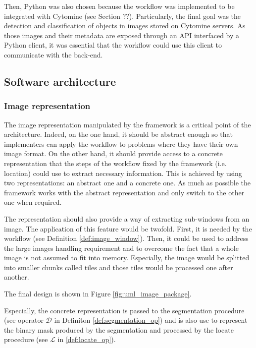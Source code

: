 Then, Python was also chosen because the workflow was implemented to be integrated with Cytomine (see Section ??). Particularly, the final goal was the detection and classification of objects in images stored on Cytomine servers. As those images and their metadata are exposed through an API interfaced by a Python client, it was essential that the workflow could use this client to communicate with the back-end. 

 
\subsection{Software architecture}

\subsubsection{Image representation} 
The image representation manipulated by the framework is a critical point of the architecture. Indeed, on the one hand, it should be abstract enough so that implementers can apply the workflow to problems where they have their own image format. On the other hand, it should provide access to a concrete representation that the steps of the workflow fixed by the framework (i.e. location) could use to extract necessary information. This is achieved by using two representations: an abstract one and a concrete one. As much as possible the framework works with the abstract representation and only switch to the other one when required. 

The representation should also provide a way of extracting sub-windows from an image. The application of this feature would be twofold. First, it is needed by the workflow (see Definition \ref{def:image_window}). Then, it could be used to address the large images handling requirement and to overcome the fact that a whole image is not assumed to fit into memory. Especially, the image would be splitted into smaller chunks called tiles and those tiles would be processed one after another.

The final design is shown in Figure \ref{fig:uml_image_package}.

Especially, the concrete representation is passed to the segmentation procedure (see operator $\mathcal{D}$ in Definiton \ref{def:segmentation_op}) and is also use to represent the binary mask produced by the segmentation and processed by the locate procedure (see $\mathcal{L}$ in \ref{def:locate_op}). 

